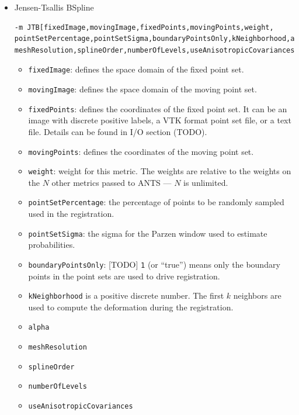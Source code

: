 \documentclass{InsightArticle}
\begin{document}
\begin{itemize}
    \item Jensen-Tsallis BSpline
    \begin{verbatim}
-m JTB[fixedImage,movingImage,fixedPoints,movingPoints,weight,
pointSetPercentage,pointSetSigma,boundaryPointsOnly,kNeighborhood,alpha,
meshResolution,splineOrder,numberOfLevels,useAnisotropicCovariances] 
    \end{verbatim}
    \begin{itemize}
        \item \verb"fixedImage": defines the space domain of the fixed point set.
        \item \verb"movingImage": defines the space domain of the moving point set.
        \item \verb"fixedPoints": defines the coordinates of the fixed point set. It can be an image with discrete positive labels, a VTK format point set file, or a text file. Details can be found in I/O section (TODO).
        \item \verb"movingPoints": defines the coordinates of the moving point set.
        \item \verb"weight": weight for this metric.  The weights are relative to the weights on the $N$ other metrics passed to ANTS --- $N$ is unlimited.
        \item \verb"pointSetPercentage": the percentage of points to be randomly sampled used in the registration.
        \item \verb"pointSetSigma": the sigma for the Parzen window used to estimate probabilities.  
        \item \verb"boundaryPointsOnly": [TODO] \verb"1" (or ``true'') means only the boundary points in the point sets are used to drive registration.
        \item \verb"kNeighborhood" is a positive discrete number. The first $k$ neighbors are used to compute the deformation during the registration. 
        \item \verb"alpha"
        \item \verb"meshResolution"
        \item \verb"splineOrder"
        \item \verb"numberOfLevels"
        \item \verb"useAnisotropicCovariances"
    \end{itemize}

\end{itemize}
\end{document}
